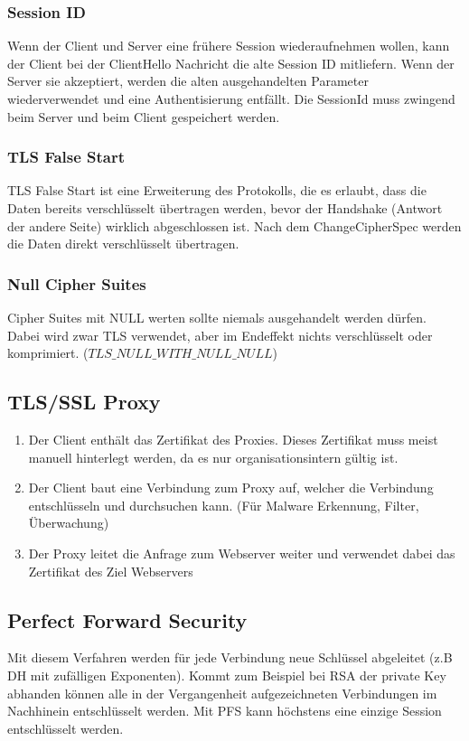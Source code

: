 \subsubsection{Session ID}
Wenn der Client und Server eine frühere Session wiederaufnehmen wollen, kann  der Client bei der ClientHello Nachricht die alte Session ID mitliefern. Wenn der Server sie akzeptiert, werden die alten ausgehandelten Parameter wiederverwendet und eine Authentisierung entfällt. Die SessionId muss zwingend beim Server und beim Client gespeichert werden.

\subsubsection{TLS False Start}
TLS False Start ist eine Erweiterung des Protokolls, die es erlaubt, dass die Daten bereits verschlüsselt übertragen werden, bevor der Handshake (Antwort der andere Seite) wirklich abgeschlossen ist. Nach dem ChangeCipherSpec werden die Daten direkt verschlüsselt übertragen.

\subsubsection{Null Cipher Suites}
Cipher Suites mit NULL werten sollte niemals ausgehandelt werden dürfen. Dabei wird zwar TLS verwendet, aber im Endeffekt nichts verschlüsselt oder komprimiert. ($TLS\_NULL\_WITH\_NULL\_NULL$)

\subsection{TLS/SSL Proxy}
\begin{enumerate}
	\item Der Client enthält das Zertifikat des Proxies. Dieses Zertifikat muss meist manuell hinterlegt werden, da es nur organisationsintern gültig ist.
	\item Der Client baut eine Verbindung zum Proxy auf, welcher die Verbindung entschlüsseln und durchsuchen kann. (Für Malware Erkennung, Filter, Überwachung)
	\item Der Proxy leitet die Anfrage zum Webserver weiter und verwendet dabei das Zertifikat des Ziel Webservers
\end{enumerate}

\subsection{Perfect Forward Security}
Mit diesem Verfahren werden für jede Verbindung neue Schlüssel abgeleitet (z.B DH mit zufälligen Exponenten). Kommt zum Beispiel bei RSA der private Key abhanden können alle in der Vergangenheit aufgezeichneten Verbindungen im Nachhinein entschlüsselt werden. Mit PFS kann höchstens eine einzige Session entschlüsselt werden.

